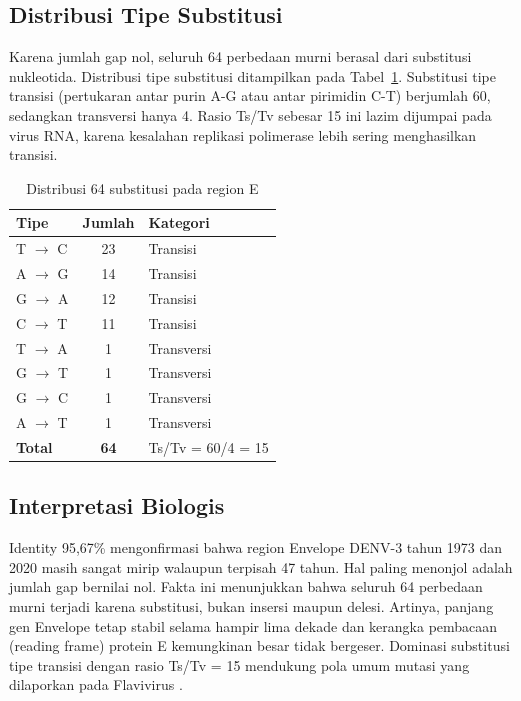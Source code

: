 \documentclass[conference]{IEEEtran}
\begin{document}
\subsection{Distribusi Tipe Substitusi}
Karena jumlah gap nol, seluruh 64 perbedaan murni berasal dari substitusi nukleotida. Distribusi tipe substitusi ditampilkan pada Tabel~\ref{tab:substitusi}. Substitusi tipe transisi (pertukaran antar purin A-G atau antar pirimidin C-T) berjumlah 60, sedangkan transversi hanya 4. Rasio Ts/Tv sebesar 15 ini lazim dijumpai pada virus RNA, karena kesalahan replikasi polimerase lebih sering menghasilkan transisi.

\begin{table}[h]
\centering
\caption{Distribusi 64 substitusi pada region E}
\label{tab:substitusi}
\renewcommand{\arraystretch}{1.1}
\begin{tabular}{l c l}
\toprule
\textbf{Tipe} & \textbf{Jumlah} & \textbf{Kategori} \\
\midrule
T $\rightarrow$ C & 23 & Transisi \\
A $\rightarrow$ G & 14 & Transisi \\
G $\rightarrow$ A & 12 & Transisi \\
C $\rightarrow$ T & 11 & Transisi \\
T $\rightarrow$ A & 1  & Transversi \\
G $\rightarrow$ T & 1  & Transversi \\
G $\rightarrow$ C & 1  & Transversi \\
A $\rightarrow$ T & 1  & Transversi \\
\midrule
\textbf{Total}    & \textbf{64} & Ts/Tv = 60/4 = 15 \\
\bottomrule
\end{tabular}
\end{table}

\subsection{Interpretasi Biologis}
Identity 95,67\% mengonfirmasi bahwa region Envelope DENV-3 tahun 1973 dan 2020 masih sangat mirip walaupun terpisah 47 tahun. Hal paling menonjol adalah jumlah gap bernilai nol. Fakta ini menunjukkan bahwa seluruh 64 perbedaan murni terjadi karena substitusi, bukan insersi maupun delesi. Artinya, panjang gen Envelope tetap stabil selama hampir lima dekade dan kerangka pembacaan (reading frame) protein E kemungkinan besar tidak bergeser. Dominasi substitusi tipe transisi dengan rasio Ts/Tv = 15 mendukung pola umum mutasi yang dilaporkan pada Flavivirus \cite{guzman2016}.
\end{document}
